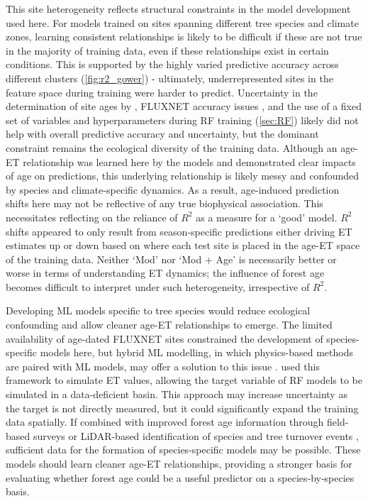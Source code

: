 \par This site heterogeneity reflects structural constraints in the model development used here. For models trained on sites spanning different tree species and climate zones, learning consistent relationships is likely to be difficult if these are not true in the majority of training data, even if these relationships exist in certain conditions. This is supported by the highly varied predictive accuracy across different clusters (\autoref{fig:r2_gower}) - ultimately, underrepresented sites in the feature space during training were harder to predict. Uncertainty in the determination of site ages by \textcite{besnard2018}, FLUXNET accuracy issues \parencite{hill2017case}, and the use of a fixed set of variables and hyperparameters during RF training (\ref{sec:RF}) likely did not help with overall predictive accuracy and uncertainty, but the dominant constraint remains the ecological diversity of the training data. Although an age-ET relationship was learned here by the models and demonstrated clear impacts of age on predictions, this underlying relationship is likely messy and confounded by species and climate-specific dynamics. As a result, age-induced prediction shifts here may not be reflective of any true biophysical association. This necessitates reflecting on the reliance of $R^2$ as a measure for a `good' model. $R^2$ shifts appeared to only result from season-specific predictions either driving ET estimates up or down based on where each test site is placed in the age-ET space of the training data. Neither `Mod' nor `Mod + Age' is necessarily better or worse in terms of understanding ET dynamics; the influence of forest age becomes difficult to interpret under such heterogeneity, irrespective of $R^2$. 

\par Developing ML models specific to tree species would reduce ecological confounding and allow cleaner age-ET relationships to emerge. The limited availability of age-dated FLUXNET sites constrained the development of species-specific models here, but hybrid ML modelling, in which physics-based methods are paired with ML models, may offer a solution to this issue \parencite{liyew2025review}. \textcite{jiang2023hybrid} used this framework to simulate ET values, allowing the target variable of RF models to be simulated in a data-deficient basin. This approach may increase uncertainty as the target is not directly measured, but it could significantly expand the training data spatially. If combined with improved forest age information through field-based surveys or LiDAR-based identification of species and tree turnover events \parencite{fischer2025global}, sufficient data for the formation of species-specific models may be possible. These models should learn cleaner age-ET relationships, providing a stronger basis for evaluating whether forest age could be a useful predictor on a species‑by‑species basis.


